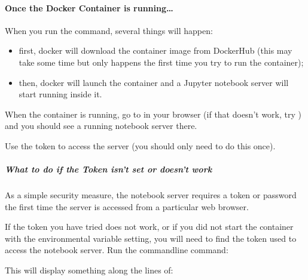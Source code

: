\documentclass[letterpaper,10pt,english]{sphinxmanual}
\let\sphinxpxdimen\pdfpxdimen\else\newdimen\sphinxpxdimen
\begin{document}
\paragraph{Once the Docker Container is running…}
\label{\detokenize{content/00_READ_ME_FIRST/Section_00_05_Accessing_RoboLab:Once-the-Docker-Container-is-running_u2026}}
When you run the  command, several things will happen:
\begin{itemize}
\item {} 
first, docker will download the container image from DockerHub (this may take some time but only happens the first time you try to run the container);

\item {} 
then, docker will launch the container and a Jupyter notebook server will start running inside it.

\end{itemize}

When the container is running, go to  in your browser (if that doesn’t work, try ) and you should see a running notebook server there.

Use the token  to access the server (you should only need to do this once).

\sphinxincludegraphics[width=1786\sphinxpxdimen,height=1576\sphinxpxdimen]{{Jupyter_Notebook_token}.png}


\subparagraph{What to do if the Token isn’t set or doesn’t work}
\label{\detokenize{content/00_READ_ME_FIRST/Section_00_05_Accessing_RoboLab:What-to-do-if-the-Token-isn_u2019t-set-or-doesn_u2019t-work}}
As a simple security measure, the notebook server requires a token or password the first time the server is accessed from a particular web browser.

If the token you have tried does not work, or if you did not start the container with the  environmental variable setting, you will need to find the token used to access the notebook server. Run the command\sphinxhyphen{}line command:


This will display something along the lines of:

\end{document}
